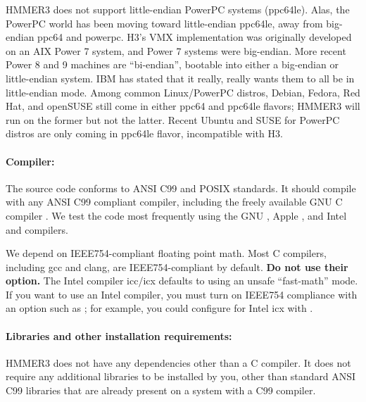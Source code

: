 HMMER3 does not support little-endian PowerPC systems (ppc64le). Alas,
the PowerPC world has been moving toward little-endian ppc64le, away
from big-endian ppc64 and powerpc. H3's VMX implementation was
originally developed on an AIX Power 7 system, and Power 7 systems
were big-endian. More recent Power 8 and 9 machines are ``bi-endian'',
bootable into either a big-endian or little-endian system. IBM has
stated that it really, really wants them to all be in little-endian
mode. Among common Linux/PowerPC distros, Debian, Fedora, Red Hat, and
openSUSE still come in either ppc64 and ppc64le flavors; HMMER3 will
run on the former but not the latter. Recent Ubuntu and SUSE for
PowerPC distros are only coming in ppc64le flavor, incompatible with
H3.

\paragraph{Compiler:} The source code conforms to ANSI
C99 and POSIX standards. It should compile with any ANSI C99 compliant
compiler, including the freely available GNU C compiler .
We test the code most frequently using the GNU , Apple
, and Intel  and 
compilers.

We depend on IEEE754-compliant floating point math.  Most C compilers,
including gcc and clang, are IEEE754-compliant by default. \textbf{Do
  not use their  option.} The Intel compiler icc/icx
defaults to using an unsafe ``fast-math'' mode. If you want to use an
Intel compiler, you must turn on IEEE754 compliance with an option
such as ; for example, you could configure for
Intel icx with .


\paragraph{Libraries and other installation requirements:}
HMMER3 does not have any dependencies other than a C compiler.  It
does not require any additional libraries to be installed by you,
other than standard ANSI C99 libraries that are already present on a
system with a C99 compiler.

